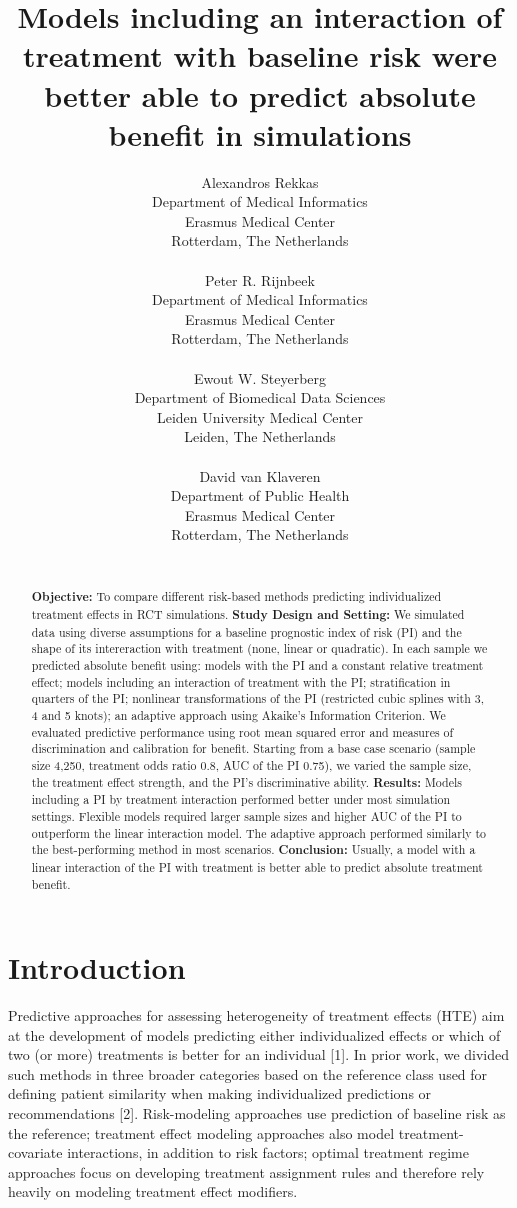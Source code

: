 \documentclass{article}
\title{Models including an interaction of treatment with baseline risk
were better able to predict absolute benefit in simulations}
\author{
    Alexandros Rekkas
   \\
    Department of Medical Informatics \\
    Erasmus Medical Center \\
  Rotterdam, The Netherlands \\
  \texttt{} \\
   \And
    Peter R. Rijnbeek
   \\
    Department of Medical Informatics \\
    Erasmus Medical Center \\
  Rotterdam, The Netherlands \\
  \texttt{} \\
   \And
    Ewout W. Steyerberg
   \\
    Department of Biomedical Data Sciences \\
    Leiden University Medical Center \\
  Leiden, The Netherlands \\
  \texttt{} \\
   \And
    David van Klaveren
   \\
    Department of Public Health \\
    Erasmus Medical Center \\
  Rotterdam, The Netherlands \\
  \texttt{} \\
  }
\date{}
\begin{document}
\maketitle

\def\tightlist{}


\begin{abstract}
\textbf{Objective:} To compare different risk-based methods predicting
individualized treatment effects in RCT simulations. \textbf{Study
Design and Setting:} We simulated data using diverse assumptions for a
baseline prognostic index of risk (PI) and the shape of its
intereraction with treatment (none, linear or quadratic). In each sample
we predicted absolute benefit using: models with the PI and a constant
relative treatment effect; models including an interaction of treatment
with the PI; stratification in quarters of the PI; nonlinear
transformations of the PI (restricted cubic splines with 3, 4 and 5
knots); an adaptive approach using Akaike's Information Criterion. We
evaluated predictive performance using root mean squared error and
measures of discrimination and calibration for benefit. Starting from a
base case scenario (sample size 4,250, treatment odds ratio 0.8, AUC of
the PI 0.75), we varied the sample size, the treatment effect strength,
and the PI's discriminative ability. \textbf{Results:} Models including
a PI by treatment interaction performed better under most simulation
settings. Flexible models required larger sample sizes and higher AUC of
the PI to outperform the linear interaction model. The adaptive approach
performed similarly to the best-performing method in most scenarios.
\textbf{Conclusion:} Usually, a model with a linear interaction of the
PI with treatment is better able to predict absolute treatment benefit.
\end{abstract}


\linenumbers

\hypertarget{introduction}{%
\section{Introduction}\label{introduction}}

Predictive approaches for assessing heterogeneity of treatment effects
(HTE) aim at the development of models predicting either individualized
effects or which of two (or more) treatments is better for an individual
{[}1{]}. In prior work, we divided such methods in three broader
categories based on the reference class used for defining patient
similarity when making individualized predictions or recommendations
{[}2{]}. Risk-modeling approaches use prediction of baseline risk as the
reference; treatment effect modeling approaches also model
treatment-covariate interactions, in addition to risk factors; optimal
treatment regime approaches focus on developing treatment assignment
rules and therefore rely heavily on modeling treatment effect modifiers.
\end{document}
